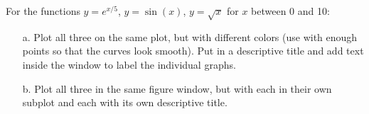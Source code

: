 {For the functions $y = e^{x/5}$, $y = \sin(x)$, $y = \sqrt{x}$ for $x$ between 0 and 10:
\begin{enumerate}
\item[a.] Plot all three on the same plot, but with different colors (use  with enough points so that the curves look smooth).  Put in a descriptive title and add text inside the window to label the individual graphs.
\item[b.] Plot all three in the same figure window, but with each in their own subplot and each with its own descriptive title.
\end{enumerate}}
{}
